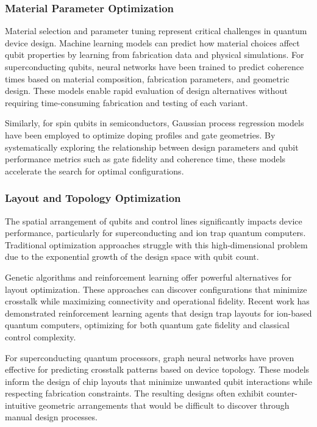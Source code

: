 \subsubsection{Material Parameter Optimization}

Material selection and parameter tuning represent critical challenges in quantum device design. Machine learning models can predict how material choices affect qubit properties by learning from fabrication data and physical simulations. For superconducting qubits, neural networks have been trained to predict coherence times based on material composition, fabrication parameters, and geometric design. These models enable rapid evaluation of design alternatives without requiring time-consuming fabrication and testing of each variant.

Similarly, for spin qubits in semiconductors, Gaussian process regression models have been employed to optimize doping profiles and gate geometries. By systematically exploring the relationship between design parameters and qubit performance metrics such as gate fidelity and coherence time, these models accelerate the search for optimal configurations.

\subsubsection{Layout and Topology Optimization}

The spatial arrangement of qubits and control lines significantly impacts device performance, particularly for superconducting and ion trap quantum computers. Traditional optimization approaches struggle with this high-dimensional problem due to the exponential growth of the design space with qubit count.

Genetic algorithms and reinforcement learning offer powerful alternatives for layout optimization. These approaches can discover configurations that minimize crosstalk while maximizing connectivity and operational fidelity. Recent work has demonstrated reinforcement learning agents that design trap layouts for ion-based quantum computers, optimizing for both quantum gate fidelity and classical control complexity.

For superconducting quantum processors, graph neural networks have proven effective for predicting crosstalk patterns based on device topology. These models inform the design of chip layouts that minimize unwanted qubit interactions while respecting fabrication constraints. The resulting designs often exhibit counter-intuitive geometric arrangements that would be difficult to discover through manual design processes.

